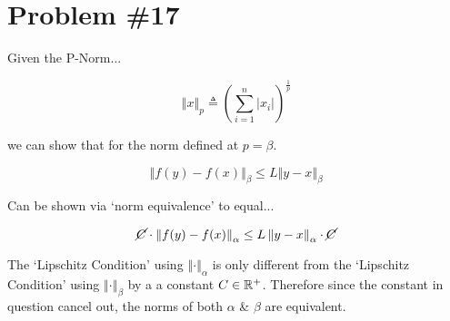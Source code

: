 
\section*{Problem \#17}

Given the P-Norm...

$$
\left\Vert x\right\Vert_{p} \triangleq \left( \sum_{i = 1}^{n} |x_{i}| \right)^{\frac{1}{p}}
$$

\noindent we can show that for the norm defined at $p = \beta$.

$$
\left\Vert f(y) - f(x) \right\Vert_{\beta} \leq L \left\Vert y - x \right\Vert_{\beta}
$$

\noindent Can be shown via `norm equivalence' to equal...

$$
\cancel{C} \cdot \left\Vert f(y) - f(x) \right\Vert_{\alpha} \leq L \left\Vert y - x \right\Vert_{\alpha} \cdot \cancel{C}
$$

\noindent The `Lipschitz Condition' using $ \left\Vert \cdot \right\Vert_{\alpha}$ is only different from the `Lipschitz Condition' using $\left\Vert \cdot \right\Vert_{\beta}$ by a a constant $C \in \mathbb{R}^{+}$. Therefore since the constant in question cancel out, the norms of both $ \alpha$ \& $\beta$ are equivalent.
